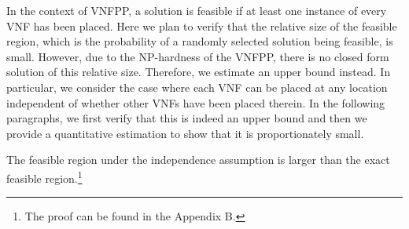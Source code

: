In the context of VNFPP, a solution is feasible if at least one instance of every VNF has been placed. Here we plan to verify that the relative size of the feasible region, which is the probability of a randomly selected solution being feasible, is small. However, due to the NP-hardness of the VNFPP, there is no closed form solution of this relative size. Therefore, we estimate an upper bound instead. In particular, we consider the case where each VNF can be placed at any location independent of whether other VNFs have been placed therein. In the following paragraphs, we first verify that this is indeed an upper bound and then we provide a quantitative estimation to show that it is proportionately small.

\begin{lemma}
	The feasible region under the independence assumption is larger than the exact feasible region.\footnote{The proof can be found in the Appendix B.}
\end{lemma}


